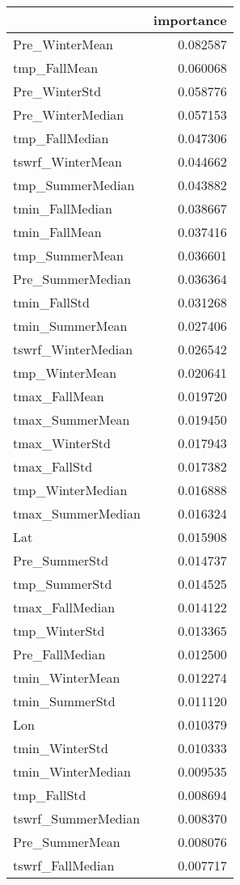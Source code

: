 \begin{tabular}{lr}
\toprule
 & importance \\
\midrule
Pre_WinterMean & 0.082587 \\
tmp_FallMean & 0.060068 \\
Pre_WinterStd & 0.058776 \\
Pre_WinterMedian & 0.057153 \\
tmp_FallMedian & 0.047306 \\
tswrf_WinterMean & 0.044662 \\
tmp_SummerMedian & 0.043882 \\
tmin_FallMedian & 0.038667 \\
tmin_FallMean & 0.037416 \\
tmp_SummerMean & 0.036601 \\
Pre_SummerMedian & 0.036364 \\
tmin_FallStd & 0.031268 \\
tmin_SummerMean & 0.027406 \\
tswrf_WinterMedian & 0.026542 \\
tmp_WinterMean & 0.020641 \\
tmax_FallMean & 0.019720 \\
tmax_SummerMean & 0.019450 \\
tmax_WinterStd & 0.017943 \\
tmax_FallStd & 0.017382 \\
tmp_WinterMedian & 0.016888 \\
tmax_SummerMedian & 0.016324 \\
Lat & 0.015908 \\
Pre_SummerStd & 0.014737 \\
tmp_SummerStd & 0.014525 \\
tmax_FallMedian & 0.014122 \\
tmp_WinterStd & 0.013365 \\
Pre_FallMedian & 0.012500 \\
tmin_WinterMean & 0.012274 \\
tmin_SummerStd & 0.011120 \\
Lon & 0.010379 \\
tmin_WinterStd & 0.010333 \\
tmin_WinterMedian & 0.009535 \\
tmp_FallStd & 0.008694 \\
tswrf_SummerMedian & 0.008370 \\
Pre_SummerMean & 0.008076 \\
tswrf_FallMedian & 0.007717 \\

\end{tabular}
